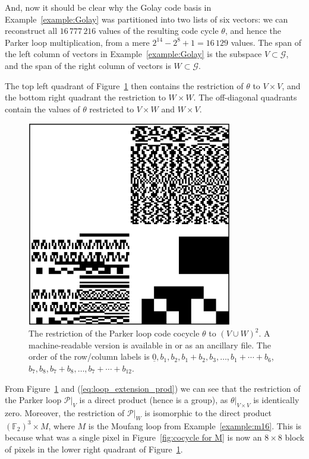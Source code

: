 \documentclass{article}
\theoremstyle{plain}
\theoremstyle{definition}
\def \cG {\mathcal{G}}
\def \cP {\mathcal{P}}
\def \FF {\mathbb{F}}
\begin{document}
And, now it should be clear why the Golay code basis in Example~\ref{example:Golay} was partitioned into two lists of six vectors: we can reconstruct all $16\,777\,216$ values of the resulting code cycle $\theta$, and hence the Parker loop multiplication, from a mere $2^{14} - 2^8 + 1 = 16\,129$ values.
The span of the left column of vectors in Example~\ref{example:Golay} is the subspace $V\subset \cG$, and the span of the right column of vectors is $W\subset \cG$.

The top left quadrant of Figure~\ref{fig:Parker cocycle} then contains the restriction of $\theta$ to $V\times V$, and the bottom right quadrant the restriction to $W\times W$. 
The off-diagonal quadrants contain the values of $\theta$ restricted to $V\times W$ and $W\times V$.

\begin{figure}[ht]
\begin{center}
\includegraphics[width=0.8\textwidth]{alpha_awesum.png}
\end{center}
\caption{The restriction of the Parker loop code cocycle $\theta$ to $(V\cup W)^2$. A machine-readable version is available in \cite{RN_GH} or as an %
ancillary file. The order of the row/column labels is $\underline{0},b_1,b_2,b_1+b_2,b_3,\ldots, b_1+\cdots +b_6$, $b_7,b_8,b_7+b_8,\ldots,b_7+\cdots + b_{12}$.}
\label{fig:Parker cocycle}
\end{figure}

From Figure~\ref{fig:Parker cocycle} and (\ref{eq:loop_extension_prod}) we can see that the restriction of the Parker loop $\cP\big|_V$ is a direct product (hence is a group), as $\theta\big|_{V\times V}$ is identically zero. 
Moreover, the restriction of $\cP\big|_W$ is isomorphic to the direct product $(\FF_2)^3 \times M$, where $M$ is the Moufang loop from Example~\ref{example:m16}.
This is because what was a single pixel in Figure~\ref{fig:cocycle for M} is now an $8\times 8$ block of pixels in the lower right quadrant of Figure~\ref{fig:Parker cocycle}.
\end{document}
